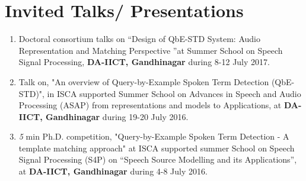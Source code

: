 \documentclass[10pt]{article}
\begin{document}
\section*{Invited Talks/ Presentations}
\begin{enumerate}
			\setlength\itemsep{0.15em}
\item Doctoral consortium talks on ``Design of QbE-STD System: Audio Representation and Matching Perspective ''at Summer School on Speech Signal Processing, \textbf{DA-IICT, Gandhinagar} during 8-12 July 2017.
\item Talk on, "An overview of Query-by-Example Spoken Term Detection (QbE-STD)", in ISCA supported Summer School on Advances in Speech and Audio Processing (ASAP) from representations and models to Applications, at \textbf{DA-IICT, Gandhinagar} during 19-20 July 2016.
\item \textit{5} min Ph.D. competition, "Query-by-Example Spoken Term Detection - A template matching approach" at ISCA supported summer School on Speech Signal Processing (S4P) on ``Speech Source Modelling and its Applications'', at \textbf{DA-IICT, Gandhinagar} during 4-8 July 2016.   
\end{enumerate}
\end{document}
